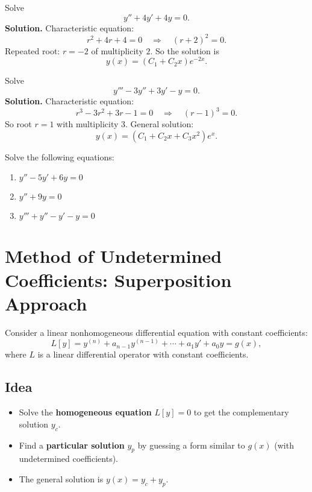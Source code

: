 \begin{example}
Solve
\[
y'' + 4y' + 4y=0.
\]
\textbf{Solution.}  
Characteristic equation:
\[
r^2+4r+4=0 \quad \Rightarrow \quad (r+2)^2=0.
\]
Repeated root: $r=-2$ of multiplicity $2$.  
So the solution is
\[
y(x)=(C_1+C_2x)e^{-2x}.
\]
\end{example}



\begin{example}
Solve
\[
y''' - 3y'' + 3y' - y=0.
\]
\textbf{Solution.}  
Characteristic equation:
\[
r^3-3r^2+3r-1=0 \quad \Rightarrow \quad (r-1)^3=0.
\]
So root $r=1$ with multiplicity 3.  
General solution:
\[
y(x)=(C_1+C_2x+C_3x^2)e^x.
\]
\end{example}



\begin{question}
Solve the following equations:
\begin{enumerate}
    \item $y''-5y'+6y=0$
    \item $y''+9y=0$
    \item $y''' + y'' - y' - y = 0$
\end{enumerate}
\end{question}







\section{Method of Undetermined Coefficients: Superposition Approach}

Consider a linear nonhomogeneous differential equation with constant coefficients:
\[
L[y] = y^{(n)} + a_{n-1} y^{(n-1)} + \cdots + a_1 y' + a_0 y = g(x),
\]
where $L$ is a linear differential operator with constant coefficients.

\subsection*{Idea}
\begin{itemize}
    \item Solve the \textbf{homogeneous equation} $L[y]=0$ to get the complementary solution $y_c$.
    \item Find a \textbf{particular solution} $y_p$ by guessing a form similar to $g(x)$ (with undetermined coefficients).
    \item The general solution is $y(x)=y_c+y_p$.
\end{itemize}

